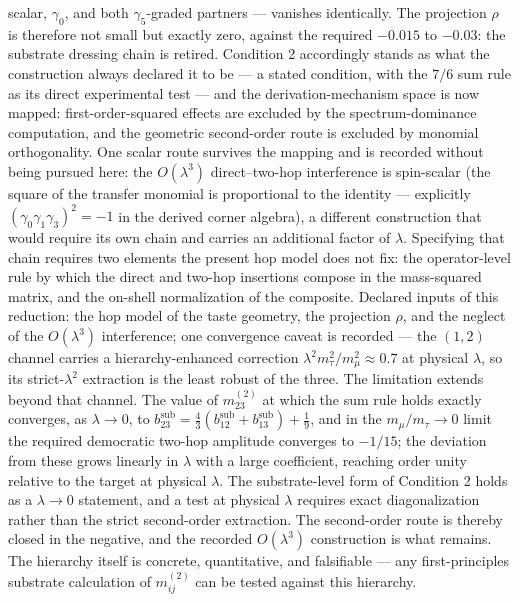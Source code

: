 \documentclass[
]{article}
\begin{document}
scalar, \(\gamma_0\), and both \(\gamma_5\)-graded partners --- vanishes
identically. The projection \(\rho\) is therefore not small but exactly
zero, against the required \(-0.015\) to \(-0.03\): the substrate
dressing chain is retired. Condition 2 accordingly stands as what the
construction always declared it to be --- a stated condition, with the
\(7/6\) sum rule as its direct experimental test --- and the
derivation-mechanism space is now mapped: first-order-squared effects
are excluded by the spectrum-dominance computation, and the geometric
second-order route is excluded by monomial orthogonality. One scalar
route survives the mapping and is recorded without being pursued here:
the \(O(\lambda^3)\) direct--two-hop interference is spin-scalar (the
square of the transfer monomial is proportional to the identity ---
explicitly \((\gamma_0\gamma_1\gamma_3)^2 = -1\) in the derived corner
algebra), a different construction that would require its own chain and
carries an additional factor of \(\lambda\). Specifying that chain
requires two elements the present hop model does not fix: the
operator-level rule by which the direct and two-hop insertions compose
in the mass-squared matrix, and the on-shell normalization of the
composite. Declared inputs of this reduction: the hop model of the taste
geometry, the projection \(\rho\), and the neglect of the
\(O(\lambda^3)\) interference; one convergence caveat is recorded ---
the \((1,2)\) channel carries a hierarchy-enhanced correction
\(\lambda^2 m_\tau^2/m_\mu^2 \approx 0.7\) at physical \(\lambda\), so
its strict-\(\lambda^2\) extraction is the least robust of the three.
The limitation extends beyond that channel. The value of
\(m^{(2)}_{23}\) at which the sum rule holds exactly converges, as
\(\lambda \to 0\), to
\(b^{\text{sub}}_{23} = \tfrac{4}{3}(b^{\text{sub}}_{12}+b^{\text{sub}}_{13}) + \tfrac{1}{9}\),
and in the \(m_\mu/m_\tau \to 0\) limit the required democratic two-hop
amplitude converges to \(-1/15\); the deviation from these grows
linearly in \(\lambda\) with a large coefficient, reaching order unity
relative to the target at physical \(\lambda\). The substrate-level form
of Condition 2 holds as a \(\lambda \to 0\) statement, and a test at
physical \(\lambda\) requires exact diagonalization rather than the
strict second-order extraction. The second-order route is thereby closed
in the negative, and the recorded \(O(\lambda^3)\) construction is what
remains. The hierarchy itself is concrete, quantitative, and falsifiable
--- any first-principles substrate calculation of \(m_{ij}^{(2)}\) can
be tested against this hierarchy.
\end{document}
